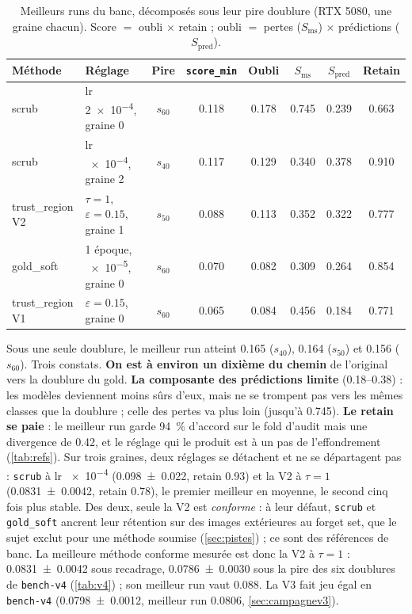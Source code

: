 \documentclass[11pt,a4paper]{article}
\newcommand{\code}[1]{\texttt{#1}}
\begin{document}
\begin{table}[ht]
  \centering\small
  \caption{Meilleurs runs du banc, décomposés sous leur pire doublure (RTX 5080, une graine
  chacun). Score $=$ oubli $\times$ retain ; oubli $=$ pertes ($S_{\text{ms}}$) $\times$ prédictions
  ($S_{\text{pred}}$).}\label{tab:meilleure}
  \setlength{\tabcolsep}{4.5pt}
  \begin{tabular}{@{}ll c SSSS S[table-format=1.3]@{}}
    \toprule
    Méthode & Réglage & Pire & {\code{score\_min}} & {Oubli} & {$S_{\text{ms}}$} & {$S_{\text{pred}}$}
      & {Retain}\\
    \midrule
    scrub & lr \num{2e-4}, graine 0 & $s_{60}$ & 0.118 & 0.178 & 0.745 & 0.239 & 0.663\\
    scrub & lr \num{e-4}, graine 2 & $s_{40}$ & 0.117 & 0.129 & 0.340 & 0.378 & 0.910\\
    trust\_region V2 & $\tau=1$, $\varepsilon=\num{0.15}$, graine 1 & $s_{50}$ & 0.088 & 0.113 & 0.352 & 0.322 & 0.777\\
    gold\_soft & 1 époque, \num{e-5}, graine 0 & $s_{60}$ & 0.070 & 0.082 & 0.309 & 0.264 & 0.854\\
    trust\_region V1 & $\varepsilon=\num{0.15}$, graine 0 & $s_{60}$ & 0.065 & 0.084 & 0.456 & 0.184 & 0.771\\
    \bottomrule
  \end{tabular}
\end{table}

Sous une seule doublure, le meilleur run atteint \num{0.165} ($s_{40}$), \num{0.164} ($s_{50}$) et
\num{0.156} ($s_{60}$). Trois constats. \textbf{On est à environ un dixième du chemin} de
l'original vers la doublure du gold. \textbf{La composante des prédictions limite} (\numrange{0.18}{0.38}) :
les modèles deviennent moins sûrs d'eux, mais ne se trompent pas vers les mêmes classes que la
doublure ; celle des pertes va plus loin (jusqu'à \num{0.745}). \textbf{Le retain se paie} : le
meilleur run garde \SI{94}{\percent} d'accord sur le fold d'audit mais une divergence de
\num{0.42}, et le réglage qui le produit est à un pas de l'effondrement (\cref{tab:refs}). Sur trois
graines, deux réglages se détachent et ne se départagent pas : \code{scrub} à lr \num{e-4}
(\num{0.098 +- 0.022}, retain \num{0.93}) et la V2 à $\tau=1$ (\num{0.0831 +- 0.0042}, retain
\num{0.78}), le premier meilleur en moyenne, le second cinq fois plus stable. Des deux, seule la V2 est
\emph{conforme} : à leur défaut, \code{scrub} et \code{gold\_soft} ancrent leur rétention sur des images
extérieures au forget set, que le sujet exclut pour une méthode soumise (\cref{sec:pistes}) ; ce
sont des références de banc. La meilleure méthode conforme mesurée est donc la V2 à $\tau=1$ :
\num{0.0831 +- 0.0042} sous recadrage, \num{0.0786 +- 0.0030} sous la pire des six doublures de
\code{bench-v4} (\cref{tab:v4}) ; son meilleur run vaut \num{0.088}. La V3 fait jeu égal en
\code{bench-v4} (\num{0.0798 +- 0.0012}, meilleur run \num{0.0806}, \cref{sec:campagnev3}).
\end{document}
